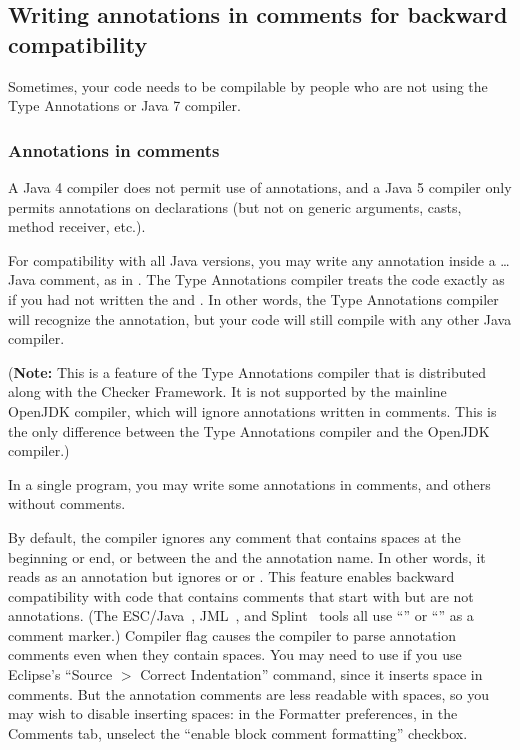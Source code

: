 \subsection{Writing annotations in comments for backward compatibility\label{annotations-in-comments}}

Sometimes, your code needs to be compilable by people who are not
using the Type Annotations or Java 7 compiler.


\subsubsection{Annotations in comments}

A Java 4 compiler does not permit use of
annotations, and a Java 5 compiler only permits annotations on
declarations (but not on generic arguments, casts, method receiver, etc.).

For compatibility with all Java versions, you may write any annotation inside a
\code{/*}\ldots\code{*/} Java comment, as in .
The Type Annotations compiler treats the code exactly as if you had not written the
\code{/*} and \code{*/}.
In other words, the Type Annotations compiler will recognize the
annotation, but your code will still compile with any other Java compiler.

(\textbf{Note:} This is a feature of the Type Annotations compiler that is
distributed along with the Checker Framework.  It is not supported by the
mainline OpenJDK compiler, which will ignore annotations written in
comments.  This is the only difference between the Type Annotations
compiler and the OpenJDK compiler.)

In a single program, you may write some annotations in comments, and others
without comments.

By default, the compiler ignores any comment that contains spaces at the
beginning or end, or between the  and the annotation name.  
In other words, it reads  as an annotation but ignores
 or  or .
This
feature enables backward compatibility with code that contains comments
that start with  but are not annotations.  (The
ESC/Java~\cite{FlanaganLLNSS02}, JML~\cite{LeavensBR2006:JML}, and
Splint~\cite{Evans96} tools all use ``'' or ``'' as a
comment marker.)
Compiler flag
 causes the compiler to parse annotation comments
even when they contain spaces.  You may need to use
 if you use Eclipse's ``Source $>$ Correct
Indentation'' command, since it inserts space in comments.  But the
annotation comments are less readable with spaces, so you may wish to disable
inserting spaces:  in the Formatter preferences, in the Comments tab,
unselect the ``enable block comment formatting'' checkbox.


